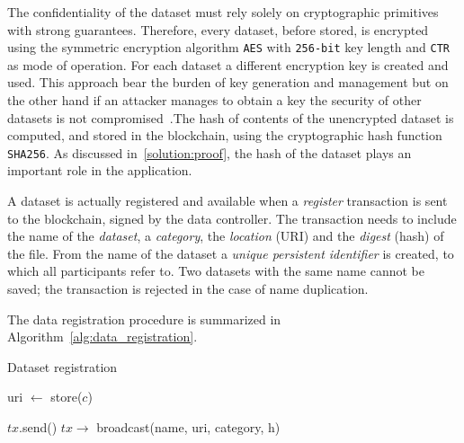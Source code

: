 The confidentiality of the dataset must rely solely on cryptographic primitives with strong guarantees. Therefore, every dataset, before stored, is encrypted using the symmetric encryption algorithm \verb|AES| with \verb|256-bit| key length and \verb|CTR| as mode of operation. For each dataset a different encryption key is created and used. This approach bear the burden of key generation and management but on the other hand if an attacker manages to obtain a key the security of other datasets is not compromised~\cite{schneier1997improved}.The hash of contents of the unencrypted dataset is computed, and stored in the blockchain, using the cryptographic hash function \verb|SHA256|. As discussed in~\ref{solution:proof}, the hash of the dataset plays an important role in the application.

A dataset is actually registered and available when a \textit{register} transaction is sent to the blockchain, signed by the data controller. The transaction needs to include the name of the \textit{dataset}, a \textit{category}, the \textit{location} (URI) and the \textit{digest} (hash) of the file. From the name of the dataset a \textit{unique persistent identifier} is created, to which all participants refer to. Two datasets with the same name cannot be saved; the transaction is rejected in the case of name duplication.

The data registration procedure is summarized in Algorithm~\ref{alg:data_registration}.

\begin{algorithm}[!htb]
  \caption{Dataset registration}\label{alg:data_registration}
  \begin{algorithmic}[1]
       
       
       
      \State uri $\leftarrow$ store($c$) 
      \State {}
  \EndFunction

         
         
        \State $tx$.send() 
        \State {}
  \EndFunction
     
    \State $tx \rightarrow$ broadcast(name, uri, category, h) 
    \State {}
  \EndProcedure
  \end{algorithmic}
\end{algorithm}

